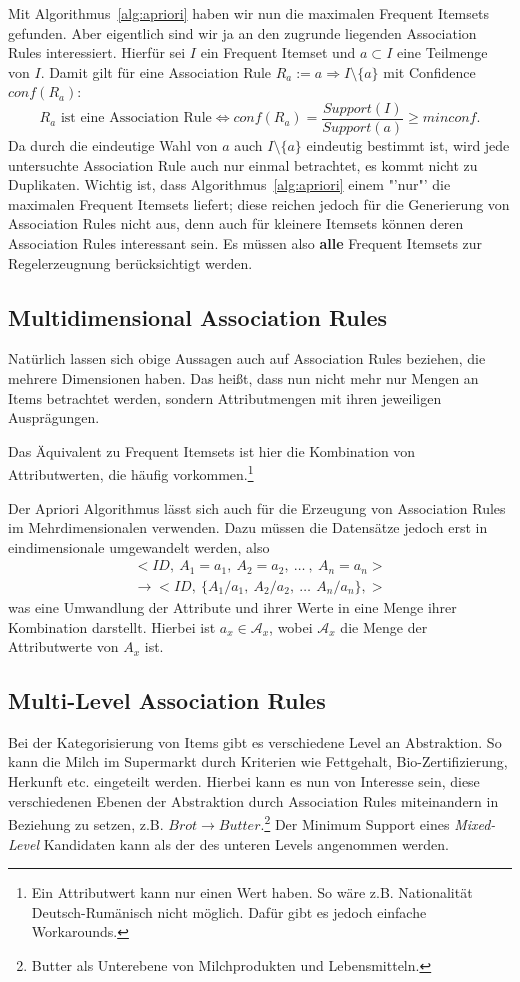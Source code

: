 Mit Algorithmus~\ref{alg:apriori} haben wir nun die maximalen Frequent Itemsets
gefunden. Aber eigentlich sind wir ja an den zugrunde liegenden Association Rules
interessiert. Hierfür sei \(I\) ein Frequent Itemset und \(a \subset I\) eine
Teilmenge von \(I\). Damit gilt für eine Association Rule 
\(R_a := a \Longrightarrow I\setminus\{a\} \) mit 
Confidence \(conf(R_a)\):
\[
	R_a \text{ ist eine Association Rule} \Longleftrightarrow conf(R_a) = 
	\frac{Support(I)}{Support(a)} \geq minconf.
\]
Da durch die eindeutige Wahl von \(a\) auch \(I\setminus\{a\}\) eindeutig bestimmt
ist, wird jede untersuchte Association Rule auch nur einmal betrachtet, es kommt
nicht zu Duplikaten. Wichtig ist, dass Algorithmus~\ref{alg:apriori} einem "'nur"'
die maximalen Frequent Itemsets liefert; diese reichen jedoch für die Generierung
von Association Rules nicht aus, denn auch für kleinere Itemsets können deren
Association Rules interessant sein. Es müssen also \textbf{alle} Frequent Itemsets
zur Regelerzeugnung berücksichtigt werden.

\subsection{Multidimensional Association Rules}
Natürlich lassen sich obige Aussagen auch auf Association Rules beziehen, die
mehrere Dimensionen haben. Das heißt, dass nun nicht mehr nur Mengen an Items
betrachtet werden, sondern Attributmengen mit ihren jeweiligen Ausprägungen.

Das Äquivalent zu Frequent Itemsets ist hier die Kombination von Attributwerten,
die häufig vorkommen.\footnote{Ein Attributwert kann nur einen Wert haben. So wäre 
z.B. Nationalität Deutsch-Rumänisch nicht möglich. Dafür gibt es jedoch 
einfache Workarounds.}

Der Apriori Algorithmus lässt sich auch für die Erzeugung von Association Rules
im Mehrdimensionalen verwenden. Dazu müssen die Datensätze jedoch erst in
eindimensionale umgewandelt werden, also
\begin{eqnarray*}
	<ID,\ A_1=a_{1},\ A_2=a_{2},\ \dots\ ,\ A_n=a_{n}>\\
	\longrightarrow <ID,\ \{A_1/a_1,\ A_2/a_2,\ \dots\,\ A_n/a_n\},>
\end{eqnarray*}
was eine Umwandlung der Attribute und ihrer Werte in eine Menge ihrer Kombination darstellt.
Hierbei ist \(a_x \in \mathcal{A}_x\), wobei \(\mathcal{A}_x\) die
Menge der Attributwerte von \(A_x\) ist.

\subsection{Multi-Level Association Rules}
Bei der Kategorisierung von Items gibt es verschiedene Level an Abstraktion. So
kann die Milch im Supermarkt durch Kriterien wie Fettgehalt, Bio-Zertifizierung,
Herkunft etc. eingeteilt werden. Hierbei kann es nun von Interesse sein, diese 
verschiedenen Ebenen der Abstraktion durch Association Rules miteinandern in 
Beziehung zu setzen, z.B. \(Brot \longrightarrow Butter\).\footnote{Butter als
Unterebene von Milchprodukten und Lebensmitteln.} Der Minimum Support eines
\textit{Mixed-Level} Kandidaten kann als der des unteren Levels angenommen werden.

